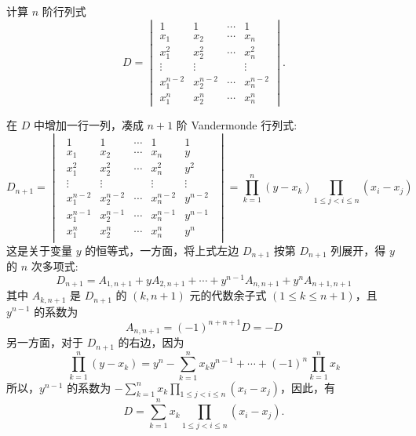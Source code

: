 \begin{example}[2006 山东大学]
    计算 $n$ 阶行列式\label{fmty}
    $$D=\begin{vmatrix}
            1         & 1         & \cdots & 1         \\
            x_1       & x_2       & \cdots & x_n       \\
            x_1^2     & x_2^2     & \cdots & x_n^2     \\
            \vdots    & \vdots    &        & \vdots    \\
            x_1^{n-2} & x_2^{n-2} & \cdots & x_n^{n-2} \\
            x_1^n     & x_2^n     & \cdots & x_n^n
        \end{vmatrix}.$$
\end{example}
\begin{solution}
    在 $D$ 中增加一行一列，凑成 $n+1$ 阶 Vandermonde 行列式:
    $$D_{n+1}=\begin{vmatrix}
            \begin{array}{cccc|c|}
                1         & 1         & \cdots & 1         & 1       \\
                x_1       & x_2       & \cdots & x_n       & y       \\
                x_1^2     & x_2^2     & \cdots & x_n^2     & y^2     \\
                \vdots    & \vdots    &        & \vdots    & \vdots  \\
                x_1^{n-2} & x_2^{n-2} & \cdots & x_n^{n-2} & y^{n-2} \\ \hline
                x_1^{n-1} & x_2^{n-1} & \cdots & x_n^{n-1} & y^{n-1} \\ \hline
                x_1^n     & x_2^n     & \cdots & x_n^n     & y^n
            \end{array}
        \end{vmatrix}=\prod_{k=1}^{n}(y-x_k)\prod_{1\leqslant j<i\leqslant n}(x_i-x_j)$$
        这是关于变量 $y$ 的恒等式，一方面，将上式左边 $D_{n+1}$ 按第 $D_{n+1}$ 列展开，得 $y$ 的 $n$ 次多项式:
        $$D_{n+1}=A_{1,n+1}+yA_{2,n+1}+\cdots+y^{n-1}A_{n,n+1}+y^nA_{n+1,n+1}$$
        其中 $A_{k,n+1}$ 是 $D_{n+1}$ 的 $(k,n+1)$ 元的代数余子式 $(1\leqslant k\leqslant n+1)$，且 $y^{n-1}$ 的系数为
        $$A_{n,n+1}=(-1)^{n+n+1}D=-D$$
        另一方面，对于 $D_{n+1}$ 的右边，因为 $$\prod_{k=1}^{n}(y-x_k)=y^n-\sum_{k=1}^{n}x_ky^{n-1}+\cdots+(-1)^n\prod_{k=1}^{n}x_k$$
        所以，$y^{n-1}$ 的系数为 $\displaystyle-\sum_{k=1}^{n}x_k\prod_{1\leqslant j<i\leqslant n}(x_i-x_j)$，因此，有
        $$D=\sum_{k=1}^{n}x_k\prod_{1\leqslant j<i\leqslant n}(x_i-x_j).$$
\end{solution}

